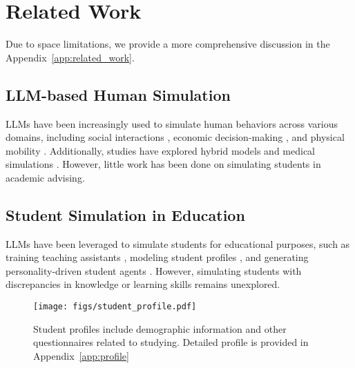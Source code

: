 \section{Related Work}
Due to space limitations, we provide a more comprehensive discussion in the Appendix~\ref{app:related_work}.

\subsection{LLM-based Human Simulation}
LLMs have been increasingly used to simulate human behaviors across various domains, including social interactions \citep{gao2023s, qian2024chatdev}, economic decision-making \citep{horton2023large, zhao2023competeai}, and physical mobility \citep{jin2023surrealdriver, zou2023wireless}. Additionally, studies have explored hybrid models \citep{park2023choicemates, williams2023epidemic} and medical simulations \citep{du2024llms}. However, little work has been done on simulating students in academic advising.

\subsection{Student Simulation in Education}
LLMs have been leveraged to simulate students for educational purposes, such as training teaching assistants \citep{markel2023gpteach}, modeling student profiles \citep{lu2024generative}, and generating personality-driven student agents \citep{liu2024personality, jin2024teachtune, ma2024students}. However, simulating students with discrepancies in knowledge or learning skills remains unexplored.



\begin{figure}[t]
  \texttt{[image: figs/student\_profile.pdf]}
  \caption{Student profiles include demographic information and other questionnaires related to studying. Detailed profile is provided in Appendix~\ref{app:profile}}
  \label{fig:student_profile}
  \vspace{-5mm}
\end{figure}